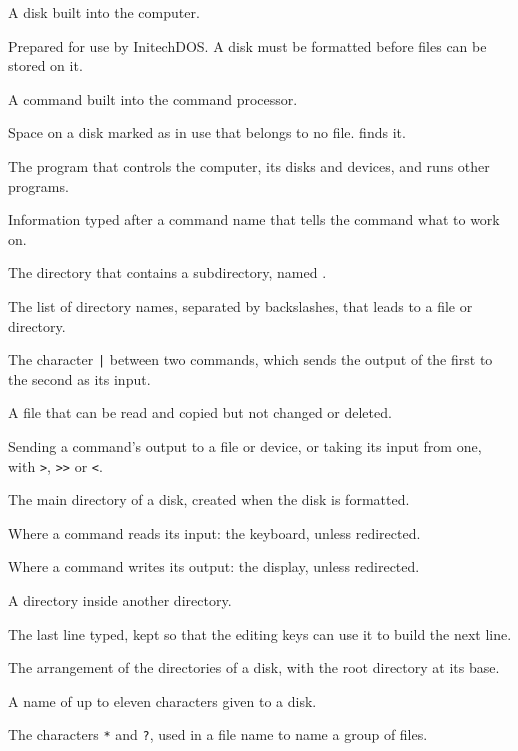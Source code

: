 A disk built into the computer.

Prepared for use by InitechDOS.  A disk must be
formatted before files can be stored on it.

A command built into the command processor.

Space on a disk marked as in use that
belongs to no file.   finds it.

The program that controls the computer, its
disks and devices, and runs other programs.

Information typed after a command name that tells the
command what to work on.

The directory that contains a subdirectory, named
.

The list of directory names, separated by backslashes, that
leads to a file or directory.

The character \texttt{|} between two commands, which sends
the output of the first to the second as its input.

A file that can be read and copied but not changed or
deleted.

Sending a command's output to a file or device, or
taking its input from one, with \texttt{>}, \texttt{>>} or \texttt{<}.

The main directory of a disk, created when the
disk is formatted.

Where a command reads its input: the keyboard,
unless redirected.

Where a command writes its output: the display,
unless redirected.

A directory inside another directory.

The last line typed, kept so that the editing keys can
use it to build the next line.

The arrangement of the directories of a disk, with the root
directory at its base.

A name of up to eleven characters given to a disk.

The characters \texttt{*} and \texttt{?}, used in a file
name to name a group of files.
